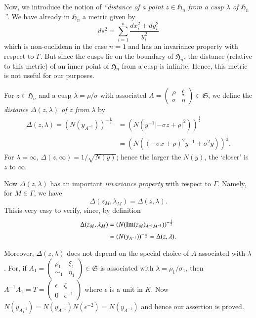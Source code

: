 Now, we introduce the notion of {\em ``distance of a point
  $z\in\mathfrak{H}_{n}$ from a cusp $\lambda$ of
  $\mathfrak{H}_{n}$''}. We have already in $\mathfrak{H}_{n}$ a
metric given by
$$
ds^{2}=\sum^{n}_{i=1}\frac{dx^{2}_{i}+dy^{2}_{i}}{y^{2}_{i}}
$$
which is non-euclidean in the case $n=1$ and has an invariance
property with respect to $\Gamma$. But since the cusps lie on the
boundary of $\mathfrak{H}_{n}$, the distance (relative to this metric)
of an inner point of $\mathfrak{H}_{n}$ from a cusp is
infinite. Hence, this metric is not useful for our purposes.

For $z\in\mathfrak{H}_{n}$ and a cusp $\lambda=\rho/\sigma$ with
associated $A=\left(\begin{smallmatrix} \rho & \xi\\ \sigma & \eta
\end{smallmatrix}\right)\in \mathfrak{S}$, we define the {\em distance
  $\Delta(z,\lambda)$ of $z$ from $\lambda$} by
\begin{align*}
\Delta(z,\lambda)=(N(y_{A^{-1}}))^{-\frac{1}{2}} &= (N(y^{-1}|-\sigma
z+\rho|^{2}))^{\frac{1}{2}}\\
&= (N((-\sigma x+\rho)^{2}y^{-1}+\sigma^{2}y))^{\frac{1}{2}}.
\end{align*}
For $\lambda=\infty$, $\Delta(z,\infty)=1/\sqrt{N(y)}$; hence the
larger the $N(y)$, the `closer' is $z$ to $\infty$.

Now $\Delta(z,\lambda)$ has an important {\em invariance property}
with respect to $\Gamma$. Namely, for $M\in\Gamma$, we have
\begin{equation*}
\Delta(z_{M},\lambda_{M})=\Delta(z,\lambda).\tag{151}\label{151}
\end{equation*}
This\pageoriginale is very easy to verify, since, by definition
\begin{align*}
\Delta(z_{M},\lambda_{M}) &=
(N(\operatorname{Im}(z_{M})_{A^{-1}M^{-1}}))^{-\frac{1}{2}}\\
&= (N(y_{A^{-1}}))^{-\frac{1}{2}}=\Delta(z,\lambda).
\end{align*}

Moreover, $\Delta(z,\lambda)$ does not depend on the special choice of
$A$ associated with $\lambda$. For, if
$A_{1}=\left(\begin{smallmatrix} \rho_{1} & \xi_{1}\\ \sim_{1} &
  \eta_{1}
\end{smallmatrix}\right)\in\mathfrak{S}$ is associated with
$\lambda=\rho_{1}/\sigma_{1}$, then
$A^{-1}A_{1}=T=\left(\begin{smallmatrix} \epsilon & \zeta\\ 0 &
  \epsilon^{-1}
\end{smallmatrix}\right)$ where $\epsilon$ is a unit in $K$. Now
$N(y_{A^{-1}_{1}})=N(y_{A^{-1}})N(\epsilon^{-2})=N(y_{A^{-1}})$ and
hence our assertion is proved.


